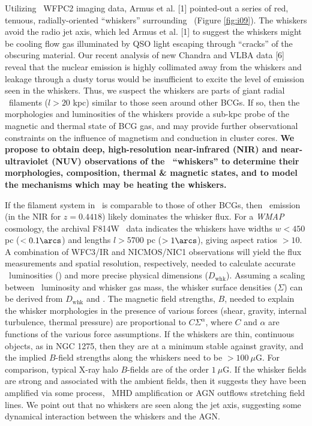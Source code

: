 \documentclass[12pt]{article}
\begin{document}
Utilizing \hst\ WFPC2 imaging data, Armus et al. [1] pointed-out a
series of red, tenuous, radially-oriented ``whiskers'' surrounding
\irs\ (Figure \ref{fig:i09}). The whiskers avoid the radio jet axis,
which led Armus et al. [1] to suggest the whiskers might be cooling
flow gas illuminated by QSO light escaping through ``cracks'' of the
obscuring material. Our recent analysis of new Chandra and VLBA data
[6] reveal that the nuclear emission is highly collimated away from
the whiskers and leakage through a dusty torus would be insufficient
to excite the level of emission seen in the whiskers. Thus, we suspect
the whiskers are parts of giant radial \halpha\ filaments ($l > 20$
kpc) similar to those seen around other BCGs. If so, then the
morphologies and luminosities of the whiskers provide a sub-kpc probe
of the magnetic and thermal state of BCG gas, and may provide further
observational constraints on the influence of magnetism and conduction
in cluster cores. {\bf{We propose to obtain deep, high-resolution
    near-infrared (NIR) and near-ultraviolet (NUV) observations of the
    \inine\ ``whiskers'' to determine their morphologies, composition,
    thermal \& magnetic states, and to model the mechanisms which may
    be heating the whiskers.}}

If the filament system in \irs\ is comparable to those of other BCGs,
then \halpha\ emission (in the NIR for $z=0.4418$) likely dominates
the whisker flux. For a {\it{WMAP}} cosmology, the archival F814W
\hst\ data indicates the whiskers have widths $w < 450$ pc ($<
0.1\arcs$) and lengths $l > 5700$ pc ($> 1\arcs$), giving aspect
ratios $> 10$. A combination of WFC3/IR and NICMOS/NIC1 observations
will yield the flux measurements and spatial resolution, respectively,
needed to calculate accurate \halpha\ luminosities (\lha) and more
precise physical dimensions ($D_{\mathrm{whk}}$). Assuming a scaling
between \halpha\ luminosity and whisker gas mass, the whisker surface
densities ($\Sigma$) can be derived from $D_{\mathrm{whk}}$ and
\lha. The magnetic field strengths, $B$, needed to explain the whisker
morphologies in the presence of various forces (shear, gravity,
internal turbulence, thermal pressure) are proportional to
$C\Sigma^\alpha$, where $C$ and $\alpha$ are functions of the various
force assumptions. If the whiskers are thin, continuous objects, as in
NGC 1275, then they are at a minimum stable against gravity, and the
implied $B$-field strengths along the whiskers need to be $> 100
~\mu$G. For comparison, typical X-ray halo $B$-fields are of the order
$1 ~\mu$G. If the whisker fields are strong and associated with the
ambient fields, then it suggests they have been amplified via some
process, \eg\ MHD amplification or AGN outflows stretching field
lines. We point out that no whiskers are seen along the jet axis,
suggesting some dynamical interaction between the whiskers and the
AGN.
\end{document}
